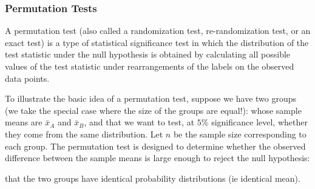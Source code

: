 	\subsubsection{Permutation Tests}
	A permutation test (also called a randomization test, re-randomization test, or an exact test) is a type of statistical significance test in which the distribution of the test statistic under the null hypothesis is obtained by calculating all possible values of the test statistic under rearrangements of the labels on the observed data points. 
	
	To illustrate the basic idea of a permutation test, suppose we have two groups (we take the special case where the size of the groups are equal!):
	 whose sample means are $\bar{x}_{A}$ and $\bar{x}_{B}$, and that we want to test, at $5\%$ significance level, whether they come from the same distribution. Let $n$ be the sample size corresponding to each group. The permutation test is designed to determine whether the observed difference between the sample means is large enough to reject the null hypothesis:
	
	that the two groups have identical probability distributions (ie identical mean).
	
